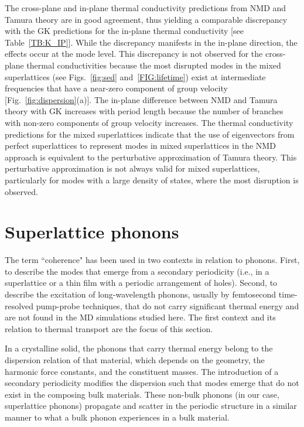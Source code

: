 \documentclass[aps,prb,preprint,preprintnumbers,amsmath,amssymb,floatfix,superscriptaddress]{revtex4}
\begin{document}
The cross-plane and in-plane thermal conductivity predictions from NMD and Tamura theory are in good agreement, thus yielding a comparable discrepancy with the GK predictions for the in-plane thermal conductivity [see Table~\ref{TB:K_IP}]. While the discrepancy manifests in the in-plane direction, the effects occur at the mode level. This discrepancy is not observed for the cross-plane thermal conductivities because the most disrupted modes in the mixed superlattices (see Figs.~\ref{fig:sed} and~\ref{FIG:lifetime}) exist at intermediate frequencies that have a near-zero component of group velocity [Fig.~\ref{fig:dispersion}(a)]. The in-plane difference between NMD and Tamura theory with GK increases with period length because the number of branches with non-zero components of group velocity increases. The thermal conductivity predictions for the mixed superlattices indicate that the use of eigenvectors from perfect superlattices to represent modes in mixed superlattices in the NMD approach is equivalent to the perturbative approximation of Tamura theory. This perturbative approximation is not always valid for mixed superlattices, particularly for modes with a large density of states, where the most disruption is observed.

\section{Superlattice phonons}\label{SEC:sl_phon}
The term ``coherence" has been used in two contexts in relation to phonons. First, to describe the modes that emerge from a secondary periodicity (i.e., in a superlattice\cite{Luckyanova16112012}  or a thin film with a periodic arrangement of holes\cite{doi:10.1021/nl102918q,PhysRevB.87.195301}). Second, to describe the excitation of long-wavelength phonons, usually by femtosecond time-resolved pump-probe techniques,\cite{PhysRevLett.73.740,PhysRevB.75.195309} that do not carry significant thermal energy and are not found in the MD simulations studied here. The first context and its relation to thermal transport are the focus of this section.

In a crystalline solid, the phonons that carry thermal energy belong to the dispersion relation of that material, which depends on the geometry, the harmonic force constants, and the constituent masses. The introduction of a secondary periodicity modifies the dispersion such that modes emerge that do not exist in the composing bulk materials. These non-bulk phonons (in our case, superlattice phonons) propagate and scatter in the periodic structure in a similar manner to what a bulk phonon experiences in a bulk material. 
\end{document}
